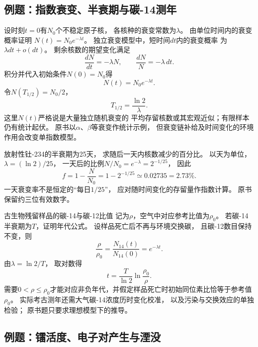 \subsection{例题：指数衰变、半衰期与碳-14测年}

\problemtext 设时刻$t=0$有$N_0$个不稳定原子核，
各核种的衰变常数为$\lambda$。
由单位时间内的衰变概率证明
$N(t)=N_0e^{-\lambda t}$。
\workings
独立衰变模型中，短时间$dt$内的衰变概率
为$\lambda dt+o(dt)$。
剩余核数的期望变化满足
\[
 \frac{dN}{dt}=-\lambda N,\qquad
 \frac{dN}{N}=-\lambda\,dt.
\]
积分并代入初始条件$N(0)=N_0$得
\[
 \boxed{N(t)=N_0e^{-\lambda t}}.
\]
令$N(T_{1/2})=N_0/2$，
\[
 \boxed{T_{1/2}=\frac{\ln2}{\lambda}}.
\]
\crosscheck 这里$N(t)$严格说是大量独立随机衰变的
平均存留核数或其宏观近似；有限样本仍有统计起伏。
原书以$\alpha$、$\beta$等衰变作统计示例，
但衰变链补给及时间变化的环境作用会改变单指数模型。

\problemtext 放射性钍-234的半衰期为25天，
求随后一天内核数减少的百分比。
\workings
以天为单位，
$\lambda=(\ln2)/25$，
一天后的比例$N/N_0=e^{-\lambda}=2^{-1/25}$，
因此
\[
 \boxed{f=1-\frac{N}{N_0}
 =1-2^{-1/25}\simeq0.02735=2.73\%}.
\]
\crosscheck 一天衰变率不是恒定的“每日$1/25$”，
应对随时间变化的存留量作指数计算。
原书保留约三位有效数字。

\problemtext 古生物残留样品的碳-14与碳-12比值
记为$\rho$，空气中对应参考比值为$\rho_0$。
若碳-14半衰期为$T$，证明年代公式。
\workings
设样品死亡后不再与环境交换碳，
且碳-12数目保持不变，则
\[
 \frac{\rho}{\rho_0}=
 \frac{N_{14}(t)}{N_{14}(0)}
 =e^{-\lambda t}.
\]
由$\lambda=\ln2/T$，
取对数得
\[
 \boxed{t=\frac{T}{\ln2}\ln\frac{\rho_0}{\rho}}.
\]
\crosscheck 需要$0<\rho\le\rho_0$才能对应非负年代，并假定样品死亡时初始同位素比恰等于参考值$\rho_0$。
实际考古测年还需大气碳-14浓度历时变化校准，
以及污染与交换效应的单独检验；
原书题只要求理想模型下的推导。

\subsection{例题：镭活度、电子对产生与湮没}

